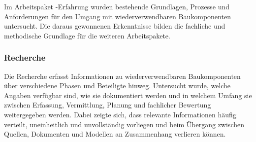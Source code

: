 \documentclass[type=zwischenbericht]{zukunftbau}
\begin{document}
Im Arbeitspaket -Erfahrung wurden bestehende Grundlagen, Prozesse und Anforderungen für den Umgang mit wiederverwendbaren Baukomponenten untersucht. Die daraus gewonnenen Erkenntnisse bilden die fachliche und methodische Grundlage für die weiteren Arbeitspakete.

\subsubsection{Recherche}
Die Recherche erfasst Informationen zu wiederverwendbaren Baukomponenten über verschiedene Phasen und Beteiligte hinweg. Untersucht wurde, welche Angaben verfügbar sind, wie sie dokumentiert werden und in welchem Umfang sie zwischen Erfassung, Vermittlung, Planung und fachlicher Bewertung weitergegeben werden. Dabei zeigte sich, dass relevante Informationen häufig verteilt, uneinheitlich und unvollständig vorliegen und beim Übergang zwischen Quellen, Dokumenten und Modellen an Zusammenhang verlieren können.
\end{document}

